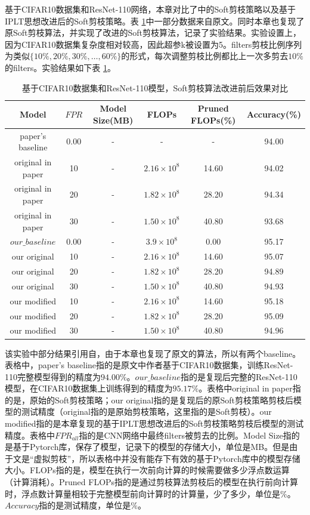 \documentclass[ pdftex, oneside, master]{NJUthesis}
\begin{document}
基于CIFAR10数据集和ResNet-110网络，本章对比了\cite{27}中的Soft剪枝策略以及基于IPLT思想改进后的Soft剪枝策略。表 \ref{2cifarresnet}中一部分数据来自原文\cite{27}。同时本章也复现了原Soft剪枝算法，并实现了改进的Soft剪枝算法，记录了实验结果。实验设置上，因为CIFAR10数据集复杂度相对较高，因此超参k被设置为5。filters剪枝比例序列为类似$\{10\%, 20\%, 30\%, \dots, 60\%\}$的形式，每次调整剪枝比例都比上一次多剪去$10\%$的filters。实验结果如下表 \ref{2cifarresnet}。

\begin{table}[htbp]
 \caption{基于CIFAR10数据集和ResNet-110模型，Soft剪枝算法改进前后效果对比}
 \begin{tabular}{cccccc}
  \hline
  \hline
  Model&$FPR$&Model Size(MB)&FLOPs&Pruned FLOPs(\%)&Accuracy(\%)\\

  \hline
  paper's baseline&0.00&-&-&-&94.00\\
  \hline
  original in paper&10&-&$2.16 \times 10^8$&14.60&94.02\\
  original in paper&20&-&$1.82 \times 10^8$&28.20&94.34\\
  original in paper&30&-&$1.50 \times 10^8$&40.80&93.68\\
  \hline
  \hline
  $our\_baseline$&0.00&-&$3.9 \times 10^8$&0.00&95.17\\
  \hline
  our original&10&-&$2.16 \times 10^8$&14.60&95.07\\
  our original&20&-&$1.82 \times 10^8$&28.20&94.89\\
  our original&30&-&$1.50 \times 10^8$&40.80&94.93\\
  \hline
  our modified&10&-&$2.16 \times 10^8$&14.60&95.18\\
  our modified&20&-&$1.82 \times 10^8$&28.20&95.09\\
  our modified&30&-&$1.50 \times 10^8$&40.80&94.96\\

  \hline
  \hline
 \end{tabular}
\label{2cifarresnet}
\end{table}

该实验中部分结果引用自\cite{27}，由于本章也复现了原文的算法，所以有两个baseline。表格中，paper's baseline指的是原文\cite{27}中作者基于CIFAR10数据集，训练ResNet-110完整模型得到的精度为$94.00\%$。$our\_baseline$指的是复现后完整的ResNet-110模型，在CIFAR10数据集上训练得到的精度为$95.17\%$。表格中original in paper指的是，原始的Soft剪枝策略；our original指的是复现后的原Soft剪枝策略剪枝后模型的测试精度（original指的是原始剪枝策略，这里指的是Soft剪枝）。our modified指的是本章复现的基于IPLT思想改进后的Soft剪枝策略剪枝后模型的测试精度。表格中$FPR_{all}$指的是CNN网络中最终filters被剪去的比例。Model Size指的是基于Pytorch库，保存了模型，记录下的模型的存储大小，单位是MB。但是由于文\cite{27}是“虚拟剪枝”，所以表格中并没有能存下有效的基于Pytorch库中的模型存储大小。FLOPs指的是，模型在执行一次前向计算的时候需要做多少浮点数运算（计算消耗）。Pruned FLOPs指的是通过剪枝算法剪枝后的模型在执行前向计算时，浮点数计算量相较于完整模型前向计算时的计算量，少了多少，单位是$\%$。$Accuracy$指的是测试精度，单位是$\%$。
\end{document}
